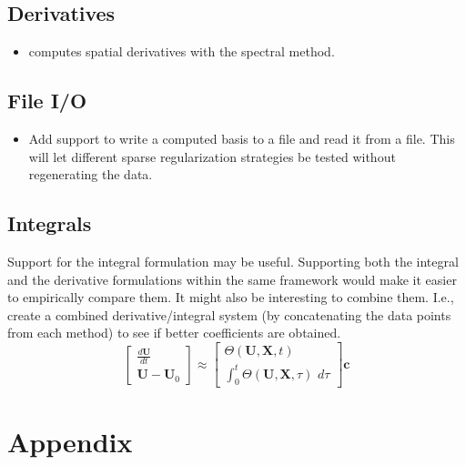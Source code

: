 \documentclass{article}
\let\vec\mathbf
\begin{document}
\subsection{Derivatives}

\begin{itemize}
    \item \cite{schaeffer2017sindy-pde2} computes spatial derivatives with the spectral method.
\end{itemize}

\subsection{File I/O}

\begin{itemize}
    \item Add support to write a computed basis to a file and read it from a
      file. This will let different sparse regularization strategies be tested
      without regenerating the data.
\end{itemize}

\subsection{Integrals}

Support for the integral formulation may be useful. Supporting both the integral
and the derivative formulations within the same framework would make it easier
to empirically compare them. It might also be interesting to combine them. I.e.,
create a combined derivative/integral system (by concatenating the data points
from each method) to see if better coefficients are obtained.
\begin{equation*}
\begin{bmatrix}
\frac{d\vec{U}}{dt} \\ \vec{U} - \vec{U}_0
\end{bmatrix}
\approx
\begin{bmatrix}
\Theta(\vec{U}, \vec{X}, t) \\ \int_0^t \Theta(\vec{U}, \vec{X}, \tau) \,\, d\tau
\end{bmatrix}
\vec{c}
\end{equation*}





\section{Appendix}
\end{document}

